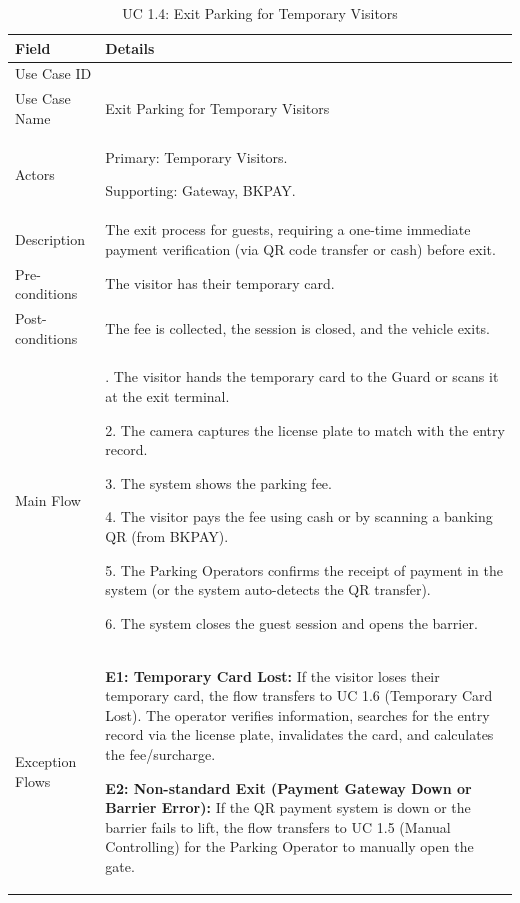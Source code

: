 \begin{table}[H]
\small
\renewcommand{\arraystretch}{1.4}
\begin{tabularx}{\textwidth}{|>{\raggedright\arraybackslash}p{3.5cm}|>{\RaggedRight\arraybackslash}X|}
\hline
\rowcolor{gray!20} \textbf{Field} & \textbf{Details} \\
\hline
Use Case ID & 1.4 \\
\hline
Use Case Name & Exit Parking for Temporary Visitors \\
\hline
Actors & Primary: Temporary Visitors. \par Supporting: Gateway, BKPAY. \\
\hline
Description & The exit process for guests, requiring a one-time immediate payment verification (via QR code transfer or cash) before exit. \\
\hline
Pre-conditions & The visitor has their temporary card. \\
\hline
Post-conditions & The fee is collected, the session is closed, and the vehicle exits. \\
\hline
Main Flow & 
1. The visitor hands the temporary card to the Guard or scans it at the exit terminal. \par
2. The camera captures the license plate to match with the entry record. \par
3. The system shows the parking fee. \par
4. The visitor pays the fee using cash or by scanning a banking QR (from BKPAY). \par
5. The Parking Operators confirms the receipt of payment in the system (or the system auto-detects the QR transfer). \par
6. The system closes the guest session and opens the barrier. \\
\hline
Exception Flows & 
\textbf{E1: Temporary Card Lost:} If the visitor loses their temporary card, the flow transfers to UC 1.6 (Temporary Card Lost). The operator verifies information, searches for the entry record via the license plate, invalidates the card, and calculates the fee/surcharge. \par \vspace{0.5em}
\textbf{E2: Non-standard Exit (Payment Gateway Down or Barrier Error):} If the QR payment system is down or the barrier fails to lift, the flow transfers to UC 1.5 (Manual Controlling) for the Parking Operator to manually open the gate. \\
\hline
\end{tabularx}
\caption{UC 1.4: Exit Parking for Temporary Visitors}
\label{tab:uc1.4}
\end{table}
